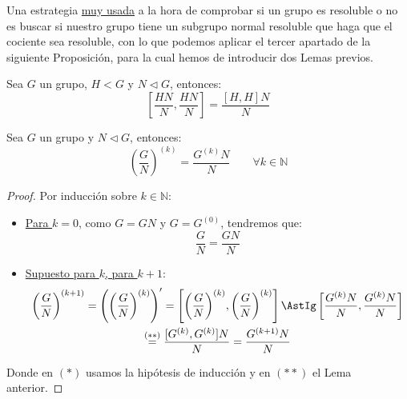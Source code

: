 \noindent
Una estrategia \underline{muy usada} a la hora de comprobar si un grupo es resoluble o no es buscar si nuestro grupo tiene un subgrupo normal resoluble que haga que el cociente sea resoluble, con lo que podemos aplicar el tercer apartado de la siguiente Proposición, para la cual hemos de introducir dos Lemas previos.

\begin{lema}
    Sea $G$ un grupo, $H<G$ y $N\lhd G$, entonces:
    \begin{equation*}
        \left[\dfrac{HN}{N}, \dfrac{HN}{N}\right] = \dfrac{[H,H]N}{N}
    \end{equation*} %
\end{lema}

\begin{lema}
    Sea $G$ un grupo y $N\lhd G$, entonces:
    \begin{equation*}
        {\left(\dfrac{G}{N}\right)}^{(k)} = \dfrac{G^{(k)}N}{N} \qquad \forall k\in \mathbb{N}
    \end{equation*}
    \begin{proof}
        Por inducción sobre $k\in \mathbb{N}$:
        \begin{itemize}
            \item \underline{Para $k=0$}, como $G=GN$ y $G=G^{(0)}$, tendremos que:
                \begin{equation*}
                    \dfrac{G}{N} = \dfrac{GN}{N}
                \end{equation*}
            \item \underline{Supuesto para $k$, para $k+1$}:
            \begin{multline*}
                {\left(\dfrac{G}{N}\right)}^{(k+1)} = \left({\left(\dfrac{G}{N}\right)}^{(k)}\right)' = \left[{\left(\dfrac{G}{N}\right)}^{(k)}, {\left(\dfrac{G}{N}\right)}^{(k)}\right] \AstIg \left[\dfrac{G^{(k)}N}{N}, \dfrac{G^{(k)}N}{N}\right] \\ \stackrel{(\ast\ast)}{=}  \dfrac{[G^{(k)}, G^{(k)}]N}{N} = \dfrac{G^{(k+1)}N}{N}
            \end{multline*}
        \end{itemize}
        Donde en $(\ast)$ usamos la hipótesis de inducción y en $(\ast\ast)$ el Lema anterior.
    \end{proof}
\end{lema}

